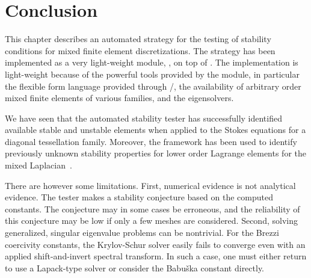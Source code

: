 \section{Conclusion}
\label{rognes:sec:conclusion}

This chapter describes an automated strategy for the testing of stability
conditions for mixed finite element discretizations. The strategy has
been implemented as a very light-weight \rognespython{} module,
\rognesascot{}, on top of \pydolfin{}. The implementation is
light-weight because of the powerful tools provided by the \pydolfin{}
module, in particular the flexible form language provided through
\ufl{}/\ffc{}, the availability of arbitrary order mixed finite
elements of various families, and the \slepc{} eigensolvers.

We have seen that the automated stability tester has successfully
identified available stable and unstable elements when applied to the
Stokes equations for a diagonal tessellation family. Moreover, the
framework has been used to identify previously unknown stability
properties for lower order Lagrange elements for the mixed
Laplacian~\cite{ArnoldRognes2009}.

There are however some limitations. First, numerical evidence is not
analytical evidence. The tester makes a stability conjecture based on
the computed constants. The conjecture may in some cases be erroneous,
and the reliability of this conjecture may be low if only a few meshes
are considered. Second, solving generalized, singular eigenvalue
problems can be nontrivial. For the Brezzi coercivity constants, the
Krylov-Schur solver easily fails to converge even with an applied
shift-and-invert spectral transform. In such a case, one must either
return to use a Lapack-type solver or consider the Babu\v ska constant
directly.



